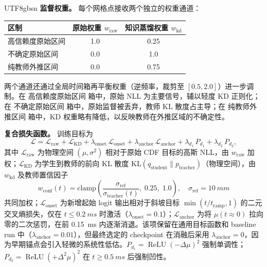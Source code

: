 \documentclass[english, 12pt, a4paper, elec, utf8, a-2b, online]{aaltothesis}
\begin{document}
\begin{CJK*}{UTF8}{gbsn}
\textbf{监督权重。}  每个网格点接收两个独立的权重通道：

\begin{center}
\begin{tabular}{lcc}
\toprule
区制 & 原始权重 $w_{\mathrm{raw}}$ & 知识蒸馏权重 $w_{\mathrm{kd}}$ \\
\midrule
高信赖度原始区间  & 1.0 & 0.25 \\
不确定原始区间 & 0.0 & 1.0  \\
纯教师外推区间  & 0.0 & 0.75 \\
\bottomrule
\end{tabular}
\end{center}

两个通道还通过全局时间箱再平衡权重（逆频率，裁剪至 $[0.5,2.0]$）进一步调制。在 高信赖度原始区间 箱中，原始 NLL 为主要信号，辅以轻度 KD 正则化；在 不确定原始区间 箱中，原始监督被丢弃，教师 KL 散度占主导；在 纯教师外推区间 箱中，KD 权重略有降低，以反映教师在外推区域的不确定性。

\textbf{复合损失函数。}  训练目标为
\[
\mathcal{L} = \mathcal{L}_{\mathrm{raw}} + \mathcal{L}_{\mathrm{KD}} + \lambda_{\mathrm{onset}}\,\mathcal{L}_{\mathrm{onset}} + \lambda_{\mathrm{anchor}}\,\mathcal{L}_{\mathrm{anchor}} + \lambda_{d_1}\,P_{d_1} + \lambda_{d_2}\,P_{d_2},
\]
其中 $\mathcal{L}_{\mathrm{raw}}$ 为物理空间 $(\mu,\sigma^2)$ 相对于原始 CDF 目标的高斯 NLL，由 $w_{\mathrm{raw}}$ 加权；$\mathcal{L}_{\mathrm{KD}}$ 为学生到教师的前向 KL 散度 $\mathrm{KL}(q_{\mathrm{student}}\|p_{\mathrm{teacher}})$（物理空间），由 $w_{\mathrm{kd}}$ 及教师置信因子
\[
w_{\mathrm{conf}}(t) = \mathrm{clamp}\!\left(\frac{\sigma_{\mathrm{ref}}}{\sigma_{\mathrm{teacher}}(t)},\;0.25,\;1.0\right),\quad\sigma_{\mathrm{ref}}=\SI{10}{mm}
\]
共同加权；$\mathcal{L}_{\mathrm{onset}}$ 为新增起始 logit 输出相对于斜坡目标 $\min(t/t_{\mathrm{ramp}},1)$ 的二元交叉熵损失，仅在 $t\leq\SI{0.2}{ms}$ 时激活（$\lambda_{\mathrm{onset}}=0.1$）；$\mathcal{L}_{\mathrm{anchor}}$ 为将 $\mu(t\approx0)$ 拉向零的二次惩罚，在前 \SI{0.15}{ms} 内逐渐消退。该项保留在通用目标函数和 baseline run 中（$\lambda_{\mathrm{anchor}}=0.01$），但最终选定的 checkpoint 在消融后采用 $\lambda_{\mathrm{anchor}}=0$，因为早期锚点会引入轻微的系统性低估。$P_{d_1}=\operatorname{ReLU}(-\Delta\mu)^2$ 强制单调性；$P_{d_2}=\operatorname{ReLU}(+\Delta^2\mu)^2$ 在 $t\geq\SI{0.5}{ms}$ 后强制凹性。


\end{CJK*}
\end{document}
